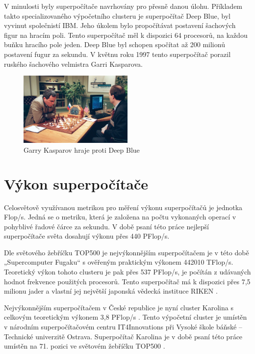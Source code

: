 V minulosti byly superpočítače navrhovány pro přesně danou úlohu. Příkladem takto specializovaného výpočetního clusteru je superpočítač Deep Blue, byl vyvinut společnistí IBM. Jeho úkolem bylo propočítávat postavení šachových figur na hracím poli. Tento superpočítač měl k dispozici 64 procesorů, na každou buňku hracího pole jeden. Deep Blue byl schopen spočítat až 200 milionů postavení fugur za sekundu. V květnu roku 1997 tento superpočítač porazil ruského šachového velmistra Garri Kasparova.\cite{Hosch20191128}

\begin{figure}[h]
	\centering
	\includegraphics[width=0.5\textwidth]{Figures/Garry-Kasparov-playing-against-Deep-Blue.jpeg}
	\caption{Garry Kasparov hraje proti Deep Blue \cite{Hosch20191128}}
	\label{fig:WritingThesis}
\end{figure}

\section{Výkon superpočítače}
Celosvětově využívanou metrikou pro měření výkonu superpočítačů je jednotka Flop/s. Jedná se o metriku, která je založena na počtu vykonaných operací v pohyblivé řadové čárce za sekundu. V době psaní této práce nejlepší superpočítače světa dosahují výkonu přes 440 PFlop/s.

Dle světového žebříčku TOP500 je nejvýkonnějším superpočítačem je v této době 
„Supercomputer Fugaku“ s ověřeným praktickým výkonem 442010 TFlop/s. Teoretický výkon tohoto clusteru je pak přes 537 PFlop/s, je počítán z udávaných hodnot frekvence použitých procesorů. Tento superpočítač má k dispozici přes 7,5 milionu jader a vlastní jej největší japonská vědecká instituce RIKEN \cite{B2TvJy8L3mSIxfWp}.

Nejvýkonnějším superpočítačem v České republice je nyní cluster Karolina s celkovým teoretickým výkonem 3,8 PFlop/s \cite{oviOzaWRPKlKSq7K}. Tento výpočetní cluster je umístěn v národním superpočítačovém centru IT4Innovations při Vysoké škole báňské – Technické univerzitě Ostrava. Superpočítač Karolina je v době psaní této práce umístěn na 71. pozici ve světovém žebříčku TOP500 \cite{iqgLoV1cXM0Qb6t1}.

